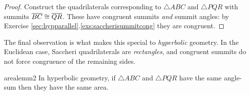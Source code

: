 \begin{proof}
	Construct the quadrilaterals corresponding to $\triangle ABC$ and $\triangle PQR$ with summits $\overline{BC}\cong\overline{QR}$. These have congruent summits \emph{and} summit angles: by Exercise \ref*{sec:hypparallel}.\ref{exs:saccherisummitcong} they are congruent.
\end{proof}

The final observation is what makes this special to \emph{hyperbolic} geometry. In the Euclidean case, Saccheri quadrilaterals are \emph{rectangles}, and congruent summits do not force congruence of the remaining sides.\goodbreak

\begin{thm}{}{arealemm2}
	In hyperbolic geometry, if $\triangle ABC$ and $\triangle PQR$ have the same angle-sum then they have the same area.
\end{thm}

